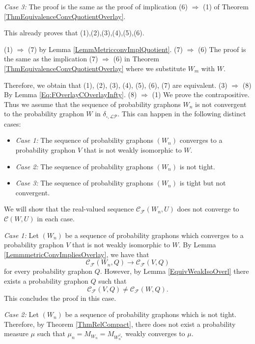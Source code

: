 \documentclass[11pt]{article}
\newcommand{\cC}{{\mathcal C}}  %
\newcommand{\cF}{{\mathcal F}}  %
\begin{document}
\emph{Case 3:}
The proof is the same as the proof of implication (6) $\Rightarrow$ (1) of  Theorem \ref{ThmEquivalenceConvQuotientOverlay}.\newline

This already proves that (1),(2),(3),(4),(5),(6).\newline


(1) $\Rightarrow$ (7) by Lemma \ref{LemmMetricconvImplQuotient}. \newline
(7) $\Rightarrow$ (6) The proof is the same as the implication (7) $\Rightarrow$ (6) in Theorem \ref{ThmEquivalenceConvQuotientOverlay} where we substitute $W_m$ with $W.$\newline

Therefore, we obtain that (1), (2), (3), (4), (5), (6), (7) are equivalent.\newline
(3) $\Rightarrow$ (8) By Lemma \ref{Eq:FOverlayCOverlayInfty}. \newline
(8) $\Rightarrow$ (1) 
We prove the contrapositive. Thus we assume that the sequence of probability graphons $W_n$ is not convergent to the probability graphon $W$ in $\delta_{\square,\mathcal{LP}}.$ This can happen in the following distinct cases:
\begin{itemize}
    \item \emph{Case 1:} The sequence of probability graphons $\left(W_n\right)$ converges to a probability graphon $V$ that is not weakly isomorphic to $W.$
    \item \emph{Case 2:} The sequence of probability graphons $\left(W_n\right)$ is not tight.
    \item \emph{Case 3:} The sequence of probability graphons $\left(W_n\right)$ is tight but not convergent.
\end{itemize}
We will show that the real-valued sequence $\cC_{\cF}(W_n,U)$ does not converge to $\cC(W,U)$ in each case. \newline

\emph{Case 1:} 
Let $\left(W_n\right)$ be a sequence of probability graphons which converges to a probability graphon $V$ that is not weakly isomorphic to $W.$ By Lemma \ref{LemmmetricConvImpliesOverlay}, we have that $$
\cC_{\cF}(W_n,Q)\rightarrow \cC_{\cF}(V,Q)
$$
for every probability graphon $Q.$ However, by Lemma \ref{EquivWeakIsoOverl} there exists a probability graphon $Q$ such that 
$$\cC_{\cF}(V,Q)\neq \cC_{\cF}(W,Q).$$ This concludes the proof in this case. \newline

\emph{Case 2:}
Let $\left(W_n\right)$ be a sequence of probability graphons which is not tight. Therefore, by Theorem \ref{ThmRelCompact}, there does not exist a probability measure $\mu$ such that $\mu_n=M_{W_n}=M_{W^{\varphi_n}_n}$ weakly converges to $\mu.$ 
\end{document}
